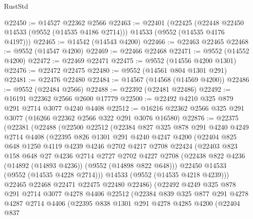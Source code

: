 \begin{lexlean}{RustStd}
\begin{coremodule}
@22450 := @14527 @22362 @2566
@22463 := @22401
    (@22425 (@22448 @22450 @14533 (@9552 (@14535 @4186 @2714))) @14533 (@9552 (@14535 @4176 @4197)))
@22465 := @14542 (@14543 @4200)
@22466 := @22463 @22465
@22468 := @9552 (@14547 @4200)
@22469 := @22466 @22468
@22471 := @9552 (@14552 @4200)
@22472 := @22469 @22471
@22475 := @9552 (@14556 @4200 @1301)
@22476 := @22472 @22475
@22480 := @9552 (@14561 @804 @1301 @291)
@22481 := @22476 @22480
@22484 := @14567 (@14568 (@14569 @4200))
@22486 := @9552 (@22484 @2566)
@22488 := @22392 (@22481 @22486)
@22492 := @16191 @22362 @2566 @2600 @17779
@22500 := @22492 @4210 @325 @879 @291 @2714 @3077 @4240 @4408
@22512 := @16216 @22362 @2566 @325 @291 @3077 (@16266 @22362 @2566 @322 @291 @3076 @16580)
@22876 := @22375
    (@22381
      (@22488
        (@22500
          @22512
          (@22384
            @827
            @325
            @878
            @291
            @4240
            @4249
            @2714
            @4408
            (@22395
              @826
              @1301
              @291
              @4240
              @4247
              @4200
              (@22404
                @825
                @648
                @1250
                @4119
                @4239
                @4246
                @2702
                @4217
                @2708
                @22424
                (@22403
                  @823
                  @158
                  @648
                  @27
                  @4236
                  @2714
                  @2727
                  @2702
                  @4227
                  @2708
                  (@22438 @822 @4236 (@14892 (@14893 @4236)) (@9552 (@14898 @822 @648)))
                  @22450
                  @14533
                  (@9552 (@14535 @4228 @2714)))
                @14533
                (@9552 (@14535 @4218 @4239)))
              @22465
              @22468
              @22471
              @22475
              @22480
              @22486)
            (@22492
              @4249
              @325
              @878
              @291
              @2714
              @3077
              @4278
              @4406
              @22512
              (@22384
                @839
                @325
                @877
                @291
                @4278
                @4287
                @2714
                @4406
                (@22395
                  @838
                  @1301
                  @291
                  @4278
                  @4285
                  @4200
                  (@22404
                    @837

\end{coremodule}
\end{lexlean}
